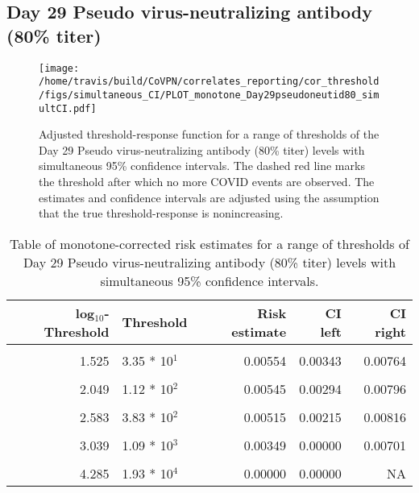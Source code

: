 \documentclass[]{book}
\theoremstyle{definition}
\theoremstyle{definition}
\theoremstyle{definition}
\newcommand{\1}{\mathbbm{1}}
\begin{document}
\newpage

\newpage

\newpage

\hypertarget{day-29-pseudo-virus-neutralizing-antibody-80-titer-3}{%
\subsection{Day 29 Pseudo virus-neutralizing antibody (80\% titer)}\label{day-29-pseudo-virus-neutralizing-antibody-80-titer-3}}

\begin{figure}[H]
\centering
\texttt{[image: /home/travis/build/CoVPN/correlates\_reporting/cor\_threshold/figs/simultaneous\_CI/PLOT\_monotone\_Day29pseudoneutid80\_simultCI.pdf]}
\caption{Adjusted threshold-response function for a range of thresholds of the
  Day 29 Pseudo virus-neutralizing antibody (80\% titer) levels with simultaneous 95\% confidence intervals. The dashed red line marks the threshold after which no more COVID events are observed. The estimates and confidence intervals are adjusted using the assumption that the true threshold-response is nonincreasing.}
\end{figure}
\begin{table}[!h]

\caption{\label{tab:unnamed-chunk-409}Table of monotone-corrected risk estimates for a range of thresholds of Day 29 Pseudo virus-neutralizing antibody (80\% titer) levels with simultaneous 95\% confidence intervals.}
\centering
\begin{tabular}[t]{rlrrr}
\toprule
log$_{10}$-Threshold & Threshold & Risk estimate & CI left & CI right\\
\midrule
\cellcolor{gray!6}{0.699} & \cellcolor{gray!6}{5.00 * 10$^0$} & \cellcolor{gray!6}{0.00585} & \cellcolor{gray!6}{0.00382} & \cellcolor{gray!6}{0.00788}\\
1.525 & 3.35 * 10$^1$ & 0.00554 & 0.00343 & 0.00764\\
\cellcolor{gray!6}{1.840} & \cellcolor{gray!6}{6.92 * 10$^1$} & \cellcolor{gray!6}{0.00554} & \cellcolor{gray!6}{0.00314} & \cellcolor{gray!6}{0.00793}\\
2.049 & 1.12 * 10$^2$ & 0.00545 & 0.00294 & 0.00796\\
\cellcolor{gray!6}{2.276} & \cellcolor{gray!6}{1.89 * 10$^2$} & \cellcolor{gray!6}{0.00534} & \cellcolor{gray!6}{0.00262} & \cellcolor{gray!6}{0.00807}\\
2.583 & 3.83 * 10$^2$ & 0.00515 & 0.00215 & 0.00816\\
\cellcolor{gray!6}{2.785} & \cellcolor{gray!6}{6.10 * 10$^2$} & \cellcolor{gray!6}{0.00515} & \cellcolor{gray!6}{0.00129} & \cellcolor{gray!6}{0.00902}\\
3.039 & 1.09 * 10$^3$ & 0.00349 & 0.00000 & 0.00701\\
\cellcolor{gray!6}{3.351} & \cellcolor{gray!6}{2.24 * 10$^3$} & \cellcolor{gray!6}{0.00242} & \cellcolor{gray!6}{0.00000} & \cellcolor{gray!6}{0.00581}\\
4.285 & 1.93 * 10$^4$ & 0.00000 & 0.00000 & NA\\
\bottomrule
\end{tabular}
\end{table}

\newpage


\end{document}
